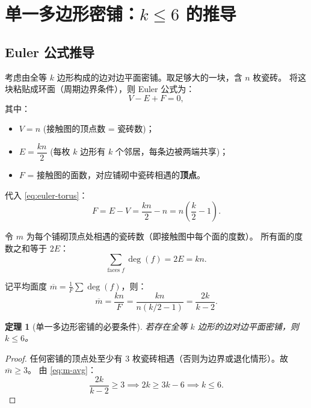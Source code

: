 \documentclass[12pt,a4paper]{article}
\theoremstyle{plain}
\newtheorem{theorem}{定理}[section]
\theoremstyle{definition}
\theoremstyle{remark}
\begin{document}
\section{单一多边形密铺：$k \le 6$ 的推导}\label{sec:monohedral-contact}

\subsection{Euler 公式推导}

考虑由全等 $k$ 边形构成的边对边平面密铺。取足够大的一块，含 $n$ 枚瓷砖。
将这块粘贴成环面（周期边界条件），则 Euler 公式为：
\begin{equation}\label{eq:euler-torus}
V - E + F = 0,
\end{equation}
其中：
\begin{itemize}
    \item $V = n$ (接触图的顶点数 = 瓷砖数)；
    \item $E = \dfrac{kn}{2}$ (每枚 $k$ 边形有 $k$ 个邻居，每条边被两端共享)；
    \item $F$ = 接触图的面数，对应铺砌中瓷砖相遇的\textbf{顶点}。
\end{itemize}

代入 \eqref{eq:euler-torus}：
\begin{equation}\label{eq:F}
F = E - V = \frac{kn}{2} - n = n\left(\frac{k}{2} - 1\right).
\end{equation}

令 $m$ 为每个铺砌顶点处相遇的瓷砖数（即接触图中每个面的度数）。
所有面的度数之和等于 $2E$：
\begin{equation}\label{eq:face-sum}
\sum_{\text{faces } f} \deg(f) = 2E = kn.
\end{equation}

记平均面度 $\overline{m} = \frac{1}{F}\sum \deg(f)$，则：
\begin{equation}\label{eq:m-avg}
\overline{m} = \frac{kn}{F}
= \frac{kn}{n(k/2 - 1)}
= \frac{2k}{k-2}.
\end{equation}

\begin{theorem}[单一多边形密铺的必要条件]\label{thm:k-bound}
若存在全等 $k$ 边形的边对边平面密铺，则 $k \le 6$。
\end{theorem}

\begin{proof}
任何密铺的顶点处至少有 $3$ 枚瓷砖相遇（否则为边界或退化情形）。故 $\overline{m} \ge 3$。
由 \eqref{eq:m-avg}：
\[
\frac{2k}{k-2} \ge 3 \implies 2k \ge 3k - 6 \implies k \le 6.
\]
\end{proof}
\end{document}
